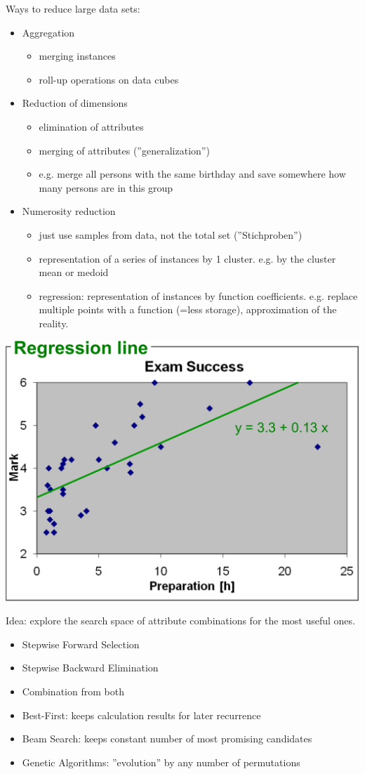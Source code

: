\begin{breakbox}

Ways to reduce large data sets:

\begin{itemize}
	\item Aggregation
		\begin{itemize}
			\item merging instances
			\item roll-up operations on data cubes
		\end{itemize}
	\item Reduction of dimensions
		\begin{itemize}
			\item elimination of attributes
			\item merging of attributes (''generalization'')
			\item e.g. merge all persons with the same birthday and save somewhere how many persons are in this group 
		\end{itemize}
	\item Numerosity reduction
		\begin{itemize}
			\item just use samples from data, not the total set (''Stichproben'')
			\item representation of a series of instances by 1 cluster. e.g. by the cluster mean or medoid
			\item regression: representation of instances by function coefficients. e.g. replace multiple points with a function (=less storage), approximation of the reality.
		\end{itemize}
\end{itemize}
\begin{center}
	\includegraphics[width=.12\textwidth]{slides_images/data_reduction_regression_line}
\end{center}
\end{breakbox}



\begin{breakbox}
Idea: explore the search space of attribute combinations for the most useful ones.
\begin{itemize}
	\item Stepwise Forward Selection
	\item Stepwise Backward Elimination
	\item Combination from both
	\item Best-First: keeps calculation results for later recurrence
	\item Beam Search: keeps constant number of most promising candidates
	\item Genetic Algorithms: ''evolution'' by any number of permutations
\end{itemize}
\end{breakbox}


